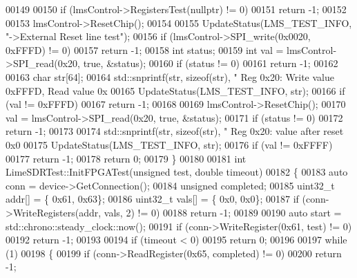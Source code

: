 \begin{DoxyCode}
{00149 
00150     \textcolor{keywordflow}{if} (lmsControl->RegistersTest(\textcolor{keyword}{nullptr}) != 0)
00151         \textcolor{keywordflow}{return} -1;
00152 
00153     lmsControl->ResetChip();
00154 
00155     UpdateStatus(LMS_TEST_INFO, \textcolor{stringliteral}{"->External Reset line test"});
00156     \textcolor{keywordflow}{if} (lmsControl->SPI_write(0x0020, 0xFFFD) != 0)
00157         \textcolor{keywordflow}{return} -1;
00158     \textcolor{keywordtype}{int} status;
00159     \textcolor{keywordtype}{int} val = lmsControl->SPI_read(0x20, \textcolor{keyword}{true}, &status);
00160     \textcolor{keywordflow}{if} (status != 0)
00161         \textcolor{keywordflow}{return} -1;
00162 
00163     \textcolor{keywordtype}{char} str[64];
00164     std::snprintf(str, \textcolor{keyword}{sizeof}(str), \textcolor{stringliteral}{"  Reg 0x20: Write value 0xFFFD, Read value 0x%
00165     UpdateStatus(LMS_TEST_INFO, str);
00166     \textcolor{keywordflow}{if} (val != 0xFFFD)
00167         \textcolor{keywordflow}{return} -1;
00168 
00169     lmsControl->ResetChip();
00170     val = lmsControl->SPI_read(0x20, \textcolor{keyword}{true}, &status);
00171     \textcolor{keywordflow}{if} (status != 0)
00172         \textcolor{keywordflow}{return} -1;
00173 
00174     std::snprintf(str, \textcolor{keyword}{sizeof}(str), \textcolor{stringliteral}{"  Reg 0x20: value after reset 0x0%
00175     UpdateStatus(LMS_TEST_INFO, str);
00176     \textcolor{keywordflow}{if} (val != 0xFFFF)
00177         \textcolor{keywordflow}{return} -1;
00178     \textcolor{keywordflow}{return} 0;
00179 \}
00180 
00181 \textcolor{keywordtype}{int} LimeSDRTest::InitFPGATest(\textcolor{keywordtype}{unsigned} test, \textcolor{keywordtype}{double} timeout)
00182 \{
00183     \textcolor{keyword}{auto} conn = device->GetConnection();
00184     \textcolor{keywordtype}{unsigned} completed;
00185     uint32\_t addr[] = \{ 0x61, 0x63\};
00186     uint32\_t vals[] = \{ 0x0, 0x0\};
00187     \textcolor{keywordflow}{if} (conn->WriteRegisters(addr, vals, 2) != 0)
00188         \textcolor{keywordflow}{return} -1;
00189 
00190     \textcolor{keyword}{auto} start = std::chrono::steady\_clock::now();
00191     \textcolor{keywordflow}{if} (conn->WriteRegister(0x61, test) != 0)
00192         \textcolor{keywordflow}{return} -1;
00193 
00194     \textcolor{keywordflow}{if} (timeout < 0)
00195         \textcolor{keywordflow}{return} 0;
00196 
00197     \textcolor{keywordflow}{while} (1)
00198     \{
00199         \textcolor{keywordflow}{if} (conn->ReadRegister(0x65, completed) != 0)
00200             \textcolor{keywordflow}{return} -1;
}}}
\end{DoxyCode}
